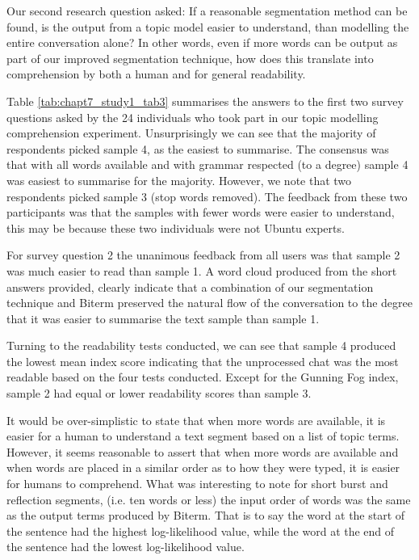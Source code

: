 Our second research question asked: If a reasonable segmentation method can be found, is the output from a topic model easier to understand, than modelling the entire conversation alone? In other words, even if more words can be output as part of our improved segmentation technique, how does this translate into comprehension by both a human and for general readability. 

Table \ref{tab:chapt7_study1_tab3} summarises the answers to the first two survey questions asked by the 24 individuals who took part in our topic modelling comprehension experiment. Unsurprisingly we can see that the majority of respondents picked sample 4, as the easiest to summarise. The consensus was that with all words available and with grammar respected (to a degree) sample 4 was easiest to summarise for the majority. However, we note that two respondents picked sample 3 (stop words removed). The feedback from these two participants was that the samples with fewer words were easier to understand, this may be because these two individuals were not Ubuntu experts.

For survey question 2 the unanimous feedback from all users was that sample 2 was much easier to read than sample 1. A word cloud produced from the short answers provided, clearly indicate that a combination of our segmentation technique and Biterm preserved the natural flow of the conversation to the degree that it was easier to summarise the text sample than sample 1.

Turning to the readability tests conducted, we can see that sample 4 produced the lowest mean index score indicating that the unprocessed chat was the most readable based on the four tests conducted. Except for the Gunning Fog index, sample 2 had equal or lower readability scores than sample 3. 

It would be over-simplistic to state that when more words are available, it is easier for a human to understand a text segment based on a list of topic terms. However, it seems reasonable to assert that when more words are available and when words are placed in a similar order as to how they were typed, it is easier for humans to comprehend. What was interesting to note for short burst and reflection segments, (i.e. ten words or less) the input order of words was the same as the output terms produced by Biterm. That is to say the word at the start of the sentence had the highest log-likelihood value, while the word at the end of the sentence had the lowest log-likelihood value.

